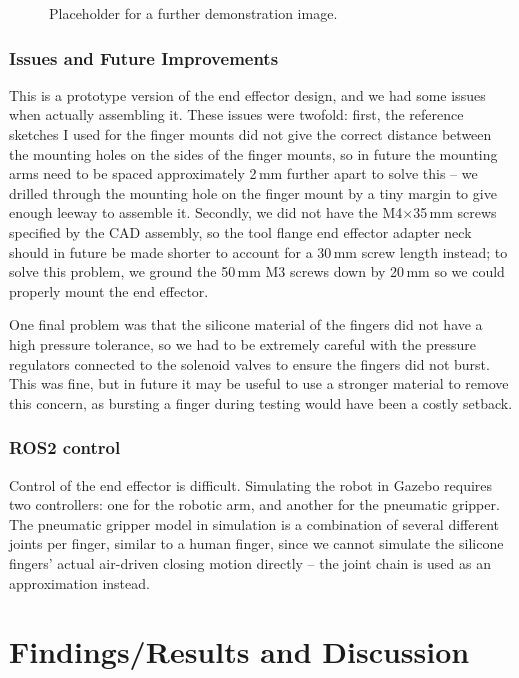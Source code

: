 \documentclass[11pt,a4paper]{report}
\newcommand{\placeholderfigure}[2][5cm]{%
  \fbox{\parbox[c][#1][c]{0.7\textwidth}{\centering\itshape #2}}%
}
\begin{document}
\begin{figure}
  \centering
  \placeholderfigure{Image pending}
  \caption{Placeholder for a further demonstration image.}
  \label{fig:demo-placeholder}
\end{figure}

\subsection{Issues and Future Improvements}

This is a prototype version of the end effector design, and we had some issues when actually
assembling it. These issues were twofold: first, the reference sketches I used for the finger
mounts did not give the correct distance between the mounting holes on the sides of the finger
mounts, so in future the mounting arms need to be spaced approximately 2\,mm further apart to
solve this -- we drilled through the mounting hole on the finger mount by a tiny margin to give
enough leeway to assemble it. Secondly, we did not have the M4$\times$35\,mm screws specified by
the CAD assembly, so the tool flange end effector adapter neck should in future be made shorter to
account for a 30\,mm screw length instead; to solve this problem, we ground the 50\,mm M3 screws
down by 20\,mm so we could properly mount the end effector.

One final problem was that the silicone material of the fingers did not have a high pressure
tolerance, so we had to be extremely careful with the pressure regulators connected to the
solenoid valves to ensure the fingers did not burst. This was fine, but in future it may be
useful to use a stronger material to remove this concern, as bursting a finger during testing
would have been a costly setback.

\subsection{ROS2 control}

Control of the end effector is difficult. Simulating the robot in Gazebo requires two
controllers: one for the robotic arm, and another for the pneumatic gripper. The pneumatic
gripper model in simulation is a combination of several different joints per finger, similar to
a human finger, since we cannot simulate the silicone fingers' actual air-driven closing motion
directly -- the joint chain is used as an approximation instead.

\chapter{Findings/Results and Discussion}
\end{document}
